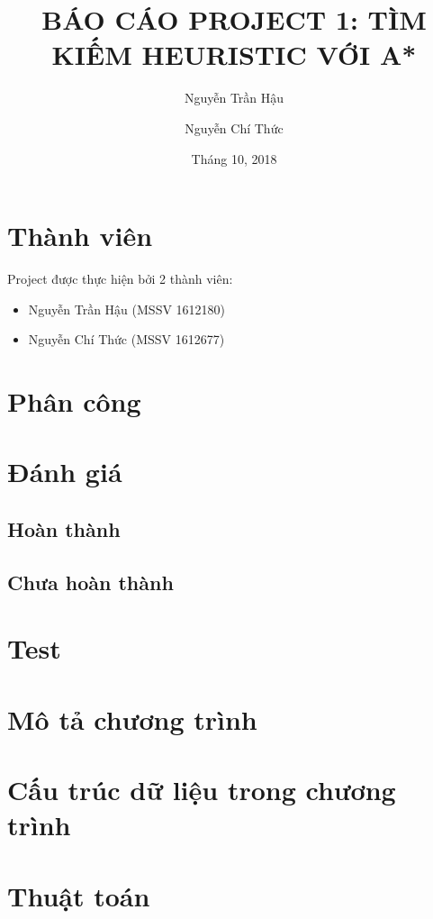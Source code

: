 \documentclass[12pt]{article}
\title{BÁO CÁO PROJECT 1: TÌM KIẾM HEURISTIC VỚI A*}
\author{Nguyễn Trần Hậu \and
Nguyễn Chí Thức}
\date{Tháng 10, 2018}
\begin{document}
\maketitle
\newpage
\tableofcontents
\newpage

\section{Thành viên}
Project được thực hiện bởi 2 thành viên:
\begin{itemize}
\item Nguyễn Trần Hậu (MSSV 1612180)
\item Nguyễn Chí Thức (MSSV 1612677)
\end{itemize}

\section{Phân công}

\section{Đánh giá}

\subsection{Hoàn thành}

\subsection{Chưa hoàn thành}

\section{Test}

\section{Mô tả chương trình}

\section{Cấu trúc dữ liệu trong chương trình}

\section{Thuật toán}
\end{document}
